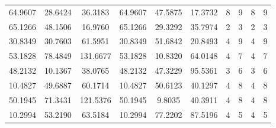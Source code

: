 \documentclass[withoutpreface,bwprint]{cumcmthesis}
\begin{document}
\begin{appendices}
\begin{table}[htbp!]
\begin{tabular}{@{}cccccccccc@{}}
				64.9607                          & 28.6424                          & 36.3183                          & 64.9607                          & 47.5875                          & 17.3732                          & 8                    & 9                    & 8                      & 9                      \\
				65.1266                          & 48.1506                          & 16.9760                          & 65.1266                          & 29.3292                          & 35.7974                          & 2                    & 3                    & 2                      & 3                      \\
				30.8349                          & 30.7603                          & 61.5951                          & 30.8349                          & 51.6842                          & 20.8493                          & 4                    & 9                    & 4                      & 9                      \\
				53.1828                          & 78.4849                          & 131.6677                         & 53.1828                          & 10.8320                          & 64.0148                          & 4                    & 7                    & 4                      & 7                      \\
				48.2132                          & 10.1367                          & 38.0765                          & 48.2132                          & 47.3229                          & 95.5361                          & 3                    & 6                    & 3                      & 6                      \\
				10.4827                          & 49.6887                          & 60.1714                          & 10.4827                          & 50.6123                          & 40.1297                          & 4                    & 8                    & 4                      & 8                      \\
				50.1945                          & 71.3431                          & 121.5376                         & 50.1945                          & 9.8035                           & 40.3911                          & 4                    & 8                    & 4                      & 8                      \\
				10.2994                          & 53.2190                          & 63.5184                          & 10.2994                          & 77.2202                          & 87.5196                          & 4                    & 5                    & 4                      & 5                      \\

\end{tabular}
\end{table}
\end{appendices}
\end{document}
